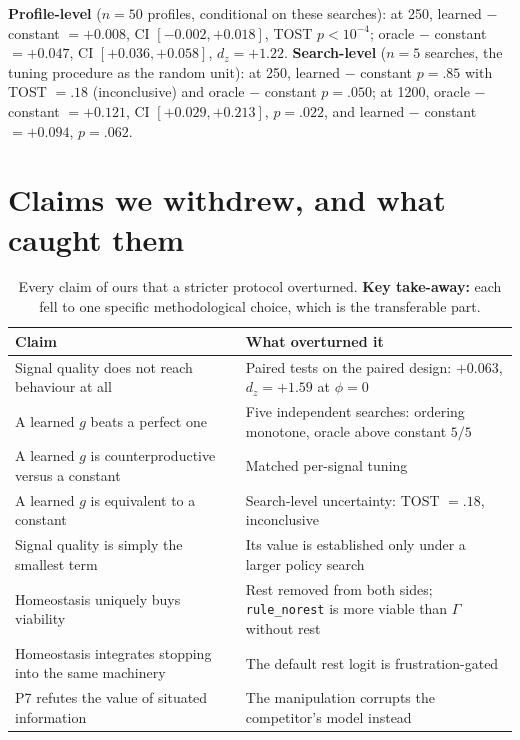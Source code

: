 \documentclass{article}
\begin{document}
\textbf{Profile-level} ($n{=}50$ profiles, conditional on these searches): at 250, learned $-$ constant $=+0.008$, CI $[-0.002,+0.018]$, TOST $p<10^{-4}$; oracle $-$ constant $=+0.047$, CI $[+0.036,+0.058]$, $d_z{=}{+}1.22$. \textbf{Search-level} ($n{=}5$ searches, the tuning procedure as the random unit): at 250, learned $-$ constant $p{=}.85$ with TOST $=.18$ (inconclusive) and oracle $-$ constant $p{=}.050$; at 1200, oracle $-$ constant $=+0.121$, CI $[+0.029,+0.213]$, $p{=}.022$, and learned $-$ constant $=+0.094$, $p{=}.062$.

\section{Claims we withdrew, and what caught them}
\label{app:withdrawn}

\begin{table}[H]
  \caption{Every claim of ours that a stricter protocol overturned. \textbf{Key take-away:} each fell to one specific methodological choice, which is the transferable part.}
  \centering\small
  \begin{tabular}{p{6.6cm}p{6.4cm}}
    \toprule
    Claim & What overturned it \\
    \midrule
    Signal quality does not reach behaviour at all & Paired tests on the paired design: $+0.063$, $d_z{=}{+}1.59$ at $\phi{=}0$ \\
    A learned $g$ beats a perfect one & Five independent searches: ordering monotone, oracle above constant $5/5$ \\
    A learned $g$ is counterproductive versus a constant & Matched per-signal tuning \\
    A learned $g$ is equivalent to a constant & Search-level uncertainty: TOST $=.18$, inconclusive \\
    Signal quality is simply the smallest term & Its value is established only under a larger policy search \\
    Homeostasis uniquely buys viability & Rest removed from both sides; \texttt{rule\_norest} is more viable than $\Gamma$ without rest \\
    Homeostasis integrates stopping into the same machinery & The default rest logit is frustration-gated \\
    P7 refutes the value of situated information & The manipulation corrupts the competitor's model instead \\
    \bottomrule
  \end{tabular}
\end{table}
\end{document}
